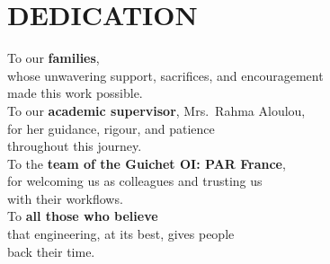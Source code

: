\chapter*{DEDICATION}
\thispagestyle{MyStyle}

\begin{center}
{\huge To} our \textbf{families},\\[10pt]
whose unwavering support, sacrifices, and encouragement\\
made this work possible.\\[20pt]

{\huge To} our \textbf{academic supervisor}, Mrs.\ Rahma Aloulou,\\
for her guidance, rigour, and patience\\
throughout this journey.\\[20pt]

{\huge To} the \textbf{team of the Guichet OI: PAR France},\\
for welcoming us as colleagues and trusting us\\
with their workflows.\\[20pt]

{\huge To} \textbf{all those who believe}\\
that engineering, at its best, gives people\\
back their time.
\end{center}

\nopagebreak{%
  \vspace{-1cm}
  \raggedleft\normalfont\large\itshape{} \reportAuthor\par%
}
